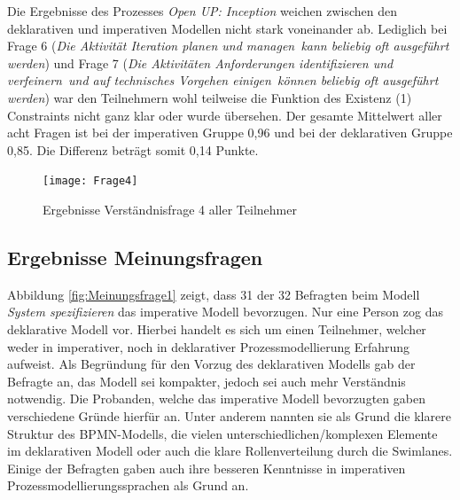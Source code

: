 Die Ergebnisse des Prozesses \textit{Open UP: Inception} weichen zwischen den deklarativen und imperativen Modellen nicht stark voneinander ab. \newline
Lediglich bei Frage 6 (\textit{Die Aktivität \grqq Iteration planen und managen\grqq \ kann beliebig oft ausgeführt werden}) und Frage 7 (\textit{Die Aktivitäten \grqq Anforderungen identifizieren und verfeinern\grqq \ und \grqq auf technisches Vorgehen einigen\grqq \ können beliebig oft ausgeführt werden}) war den Teilnehmern wohl teilweise die Funktion des Existenz (1) Constraints nicht ganz klar oder wurde übersehen.\newline
Der gesamte Mittelwert aller acht Fragen ist bei der imperativen Gruppe 0,96 und bei der deklarativen Gruppe 0,85. Die Differenz beträgt somit 0,14 Punkte. \newline


\begin{figure}[htp]
\begin{center}
  \texttt{[image: Frage4]} %
  \caption{Ergebnisse Verständnisfrage 4 aller Teilnehmer}
  \label{fig:Frage4}
\end{center}
\end{figure}

\clearpage


\subsection{Ergebnisse Meinungsfragen}

Abbildung \ref{fig:Meinungsfrage1} zeigt, dass 31 der 32 Befragten beim Modell \textit{System spezifizieren} das imperative Modell bevorzugen. Nur eine Person zog das deklarative Modell vor. Hierbei handelt es sich um einen Teilnehmer, welcher weder in imperativer, noch in deklarativer Prozessmodellierung Erfahrung aufweist. Als Begründung für den Vorzug des deklarativen Modells gab der Befragte an, das Modell sei kompakter, jedoch sei auch mehr Verständnis notwendig.\newline
Die Probanden, welche das imperative Modell bevorzugten gaben verschiedene Gründe hierfür an. Unter anderem nannten sie als Grund die klarere Struktur des BPMN-Modells, die vielen unterschiedlichen/komplexen Elemente im deklarativen Modell oder auch die klare Rollenverteilung durch die Swimlanes. Einige der Befragten gaben auch ihre besseren Kenntnisse in imperativen Prozessmodellierungssprachen als Grund an.\newline

